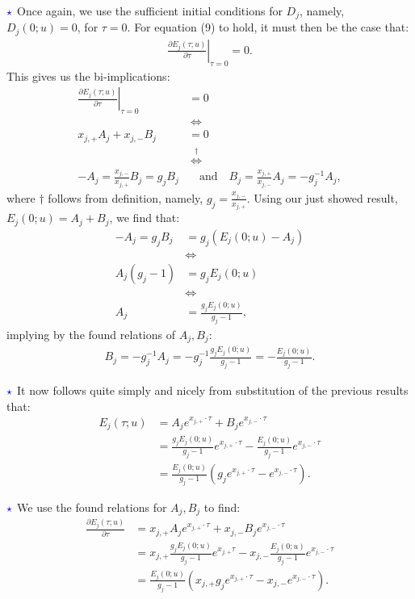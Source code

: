 \documentclass[11pt]{article}
\numberwithin{equation}{section}
\begin{document}
$\textcolor{blue}{\star}$ Once again, we use the sufficient initial conditions for $D_j$,
namely, $D_j(0;u)=0$, for $\tau=0$. For equation (9) to hold, it must then be the case
that:
\begin{align*}
    \left. \frac{\partial E_j(\tau;u)}{\partial \tau} \right|_{\tau=0}=0.
\end{align*}
This gives us the bi-implications:
\begin{align*}
    \left. \frac{\partial E_j(\tau;u)}{\partial \tau} \right|_{\tau=0}&=0\\
    &\:\iff\\
    x_{j,+} A_j+x_{j,-} B_j&=0\\
    \:&\:\overset{\dagger}{\iff}\\
    -A_j=\frac{x_{j,-}}{x_{j,+}}B_j=g_jB_j &\quad \text{and}\quad B_j=\frac{x_{j,+}}{x_{j,-}}A_j=-g_j^{-1}A_j,
\end{align*}
where $\dagger$ follows from definition, namely, $g_j=\frac{x_{j,-}}{x_{j,+}}$.
Using our just showed result, $E_j(0;u)=A_j+B_j$, we find that:
\begin{align*}
    -A_j=g_jB_j&=g_j(E_j(0;u)-A_j)\\
    &\iff\\
    A_j(g_j-1)&=g_jE_j(0;u)\\
    &\iff\\
    A_j&=\frac{g_jE_j(0;u)}{g_j-1},
\end{align*}
implying by the found relations of $A_j,B_j$:
\begin{align*}
    B_j=-g_j^{-1}A_j=-g_j^{-1}\frac{g_jE_j(0;u)}{g_j-1}=-\frac{E_j(0;u)}{g_j-1}.
\end{align*}

$\textcolor{blue}{\star}$ It now follows quite simply and nicely from
substitution of the
previous results that:
\begin{align*}
    E_j(\tau;u)&=A_je^{x_{j,+}\cdot \tau}+B_j e^{x_{j,-}\cdot \tau}\\
    &=\frac{g_jE_j(0;u)}{g_j-1}e^{x_{j,+}\cdot \tau}-\frac{E_j(0;u)}{g_j-1}e^{x_{j,-}\cdot \tau}\\
    &=\frac{E_j(0;u)}{g_j-1}\left ( g_je^{x_{j,+}\cdot \tau}-e^{x_{j,-}\cdot \tau}\right ).
\end{align*}

$\textcolor{blue}{\star}$ We use the found relations for $A_j,B_j$ to find: 
\begin{align*}
    \frac{\partial E_j(\tau;u)}{\partial \tau}&=x_{j,+}A_je^{x_{j,+}\cdot \tau}+x_{j,-}B_je^{x_{j,-}\cdot\tau}\\
    &=x_{j,+}\frac{g_jE_j(0;u)}{g_j-1}e^{x_{j,+}\tau}-x_{j,-}\frac{E_j(0;u)}{g_j-1}e^{x_{j,-}\cdot\tau}\\
    &=\frac{E_j(0;u)}{g_j-1}\left (x_{j,+}g_je^{x_{j,+}\cdot \tau} -x_{j,-}e^{x_{j,-}\cdot \tau}\right ).
\end{align*}
\end{document}
